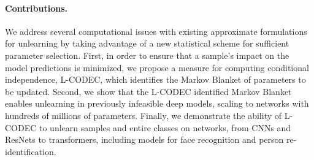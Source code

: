 \paragraph{Contributions.} We address several computational issues with existing approximate formulations for unlearning by taking advantage of a new statistical scheme for sufficient parameter selection. 
First, in order to ensure that a sample's impact on the model predictions is minimized, we propose a measure for computing conditional independence, L-CODEC, which  identifies the Markov Blanket of parameters to be updated. 
Second, we show that the L-CODEC identified Markov Blanket enables unlearning in previously infeasible deep models, scaling to networks with hundreds of millions of parameters. 
Finally, we demonstrate the ability of L-CODEC to unlearn samples and entire classes on networks, from CNNs and ResNets to transformers, including models for face recognition and person re-identification.



